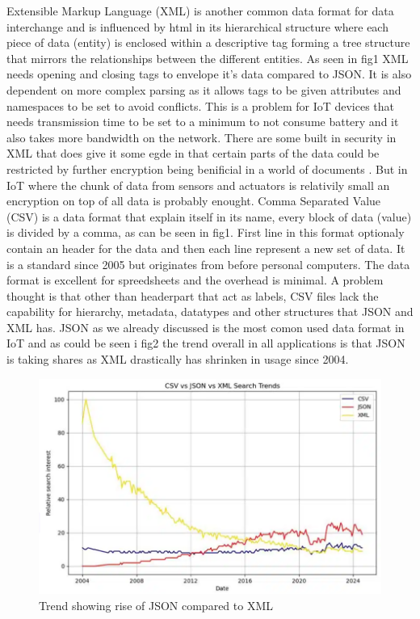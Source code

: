 \documentclass[article,a4paper]{IEEEtran}
\begin{document}
\cite{XMLdocs}Extensible Markup Language (XML) is another common data format for data interchange and is influenced by html in its hierarchical structure where each piece of data (entity) is enclosed within a descriptive tag forming a tree structure that mirrors the relationships between the different entities. As seen in fig1 XML needs opening and closing tags to envelope it's data compared to JSON. It is also dependent on more complex parsing as it allows tags to be given attributes and namespaces to be set to avoid conflicts. This is a problem for IoT devices that needs transmission time to be set to a minimum to not consume battery and it also takes more bandwidth on the network. There are some built in security in XML that does give it some egde in that certain parts of the data could be restricted by further encryption being benificial in a world of documents \cite{XMLSecurity}. But in IoT where the chunk of data from sensors and actuators is relativily small an encryption on top of all data is probably enought.    
\newline\newline
\cite{CSVdocs}Comma Separated Value (CSV) is a data format that explain itself in its name, every block of data (value) is divided by a comma, as can be seen in fig1. First line in this format optionaly contain an header for the data and then each line represent a new set of data. It is a standard since 2005 but originates from before personal computers. The data format is excellent for spreedsheets and the overhead is minimal. A problem thought is that other than headerpart that act as labels, CSV files lack the capability for hierarchy, metadata, datatypes and other structures that JSON and XML has. 
\newline\newline
JSON as we already discussed is the most comon used data format in IoT and as could be seen i fig2 the trend overall in all applications is that JSON is taking shares as XML drastically has shrinken in usage since 2004.  
\begin{figure}
    \includegraphics[width=\columnwidth]{DataFormatTrend.png} 
    \caption{ Trend showing rise of JSON compared to XML \cite{CompareJSONXMLCSV} }
    \label{fig2: Trend XML CSV JSON }   
\end{figure}
\end{document}
